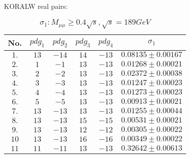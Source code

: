 \documentclass[dvips,portrait]{seminar}             %
\begin{document}
\begin{slide*}                                                %
KORALW real pairs:
{\scriptsize
\begin{table}[!ht]
\centering
\caption{\small
$\sigma_1: M_{\mu \mu} \geq 0.4\sqrt{s}, \sqrt{s}=189GeV$}
\begin{tabular}                            {||c|c|c|c|c|c||}
\hline\hline
No.             &
$pdg_1$         &
$pdg_2$         &
$pdg_3$         &
$pdg_4$         &
$\sigma_{1}$    
\\
\hline
$1.$ & $     13 $ & $    -14 $ & $     14 $ & $    -13 $ & $      0.08135\pm      0.00167$
\\
$2.$ & $      1 $ & $     -1 $ & $     13 $ & $    -13 $ & $      0.01268\pm      0.00021$
\\
$3.$ & $      2 $ & $     -2 $ & $     13 $ & $    -13 $ & $      0.02372\pm      0.00038$
\\
$4.$ & $      3 $ & $     -3 $ & $     13 $ & $    -13 $ & $      0.01247\pm      0.00023$
\\
$5.$ & $      4 $ & $     -4 $ & $     13 $ & $    -13 $ & $      0.01273\pm      0.00023$
\\
$6.$ & $      5 $ & $     -5 $ & $     13 $ & $    -13 $ & $      0.00913\pm      0.00021$
\\
$7.$ & $     13 $ & $    -13 $ & $     13 $ & $    -13 $ & $      0.01255\pm      0.00044$
\\
$8.$ & $     13 $ & $    -13 $ & $     15 $ & $    -15 $ & $      0.00531\pm      0.00021$
\\
$9.$ & $     13 $ & $    -13 $ & $     12 $ & $    -12 $ & $      0.00305\pm      0.00022$
\\
$10$ & $     13 $ & $    -13 $ & $     16 $ & $    -16 $ & $      0.00349\pm      0.00022$
\\
$11$ & $     11$ & $    -11$ & $     13$ & $    -13$ & $      0.32642\pm      0.00613$
\\
\hline\hline
\end{tabular}
\end{table}
}
\vfill
\end{slide*}   %
\end{document}
